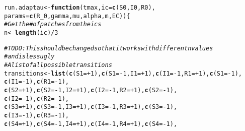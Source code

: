 \documentclass{article}\usepackage[]{graphicx}\usepackage[]{color}
\makeatletter
\newcommand{\hlnum}[1]{\textcolor[rgb]{0.686,0.059,0.569}{#1}}%
\newcommand{\hlcom}[1]{\textcolor[rgb]{0.678,0.584,0.686}{\textit{#1}}}%
\newcommand{\hlopt}[1]{\textcolor[rgb]{0,0,0}{#1}}%
\newcommand{\hlstd}[1]{\textcolor[rgb]{0.345,0.345,0.345}{#1}}%
\newcommand{\hlkwa}[1]{\textcolor[rgb]{0.161,0.373,0.58}{\textbf{#1}}}%
\newcommand{\hlkwb}[1]{\textcolor[rgb]{0.69,0.353,0.396}{#1}}%
\newcommand{\hlkwc}[1]{\textcolor[rgb]{0.333,0.667,0.333}{#1}}%
\newcommand{\hlkwd}[1]{\textcolor[rgb]{0.737,0.353,0.396}{\textbf{#1}}}%
\newenvironment{kframe}{%
 \def\at@end@of@kframe{}%
 \ifinner\ifhmode%
  \def\at@end@of@kframe{\end{minipage}}%
  \begin{minipage}{\columnwidth}%
 \fi\fi%
 \def\FrameCommand##1{\hskip\@totalleftmargin \hskip-\fboxsep
 \colorbox{shadecolor}{##1}\hskip-\fboxsep
     \hskip-\linewidth \hskip-\@totalleftmargin \hskip\columnwidth}%
 \MakeFramed {\advance\hsize-\width
   \@totalleftmargin\z@ \linewidth\hsize
   \@setminipage}}%
 {\par\unskip\endMakeFramed%
 \at@end@of@kframe}
\newenvironment{knitrout}{}{} %
\makeatother
\begin{document}
\begin{knitrout}
\color{fgcolor}\begin{kframe}
\begin{alltt}
  \hlstd{run.adaptau} \hlkwb{<-}\hlkwa{function}\hlstd{(}\hlkwc{tmax}\hlstd{,}\hlkwc{ic}\hlstd{=}\hlkwd{c}\hlstd{(S0,I0,R0),}
                              \hlkwc{params}\hlstd{=}\hlkwd{c}\hlstd{(R_0,gamma,mu,alpha,m,EC))\{}
  \hlcom{#Get the # of patches from the ics  }
  \hlstd{n} \hlkwb{<-} \hlkwd{length}\hlstd{(ic)}\hlopt{/}\hlnum{3}

  \hlcom{#TO DO: This should be changed so that it works with different n values }
  \hlcom{#and is less ugly}
  \hlcom{#A list of all possible transitions}
  \hlstd{transitions} \hlkwb{<-} \hlkwd{list}\hlstd{(}\hlkwd{c}\hlstd{(}\hlkwc{S1} \hlstd{=} \hlopt{+}\hlnum{1}\hlstd{),} \hlkwd{c}\hlstd{(}\hlkwc{S1} \hlstd{=} \hlopt{-}\hlnum{1}\hlstd{,} \hlkwc{I1}\hlstd{=} \hlopt{+}\hlnum{1}\hlstd{),} \hlkwd{c}\hlstd{(}\hlkwc{I1} \hlstd{=} \hlopt{-}\hlnum{1}\hlstd{,} \hlkwc{R1}\hlstd{=} \hlopt{+}\hlnum{1}\hlstd{),} \hlkwd{c}\hlstd{(}\hlkwc{S1} \hlstd{=} \hlopt{-}\hlnum{1}\hlstd{),}
                      \hlkwd{c}\hlstd{(}\hlkwc{I1} \hlstd{=} \hlopt{-}\hlnum{1}\hlstd{),} \hlkwd{c}\hlstd{(}\hlkwc{R1} \hlstd{=} \hlopt{-}\hlnum{1}\hlstd{),}
                    \hlkwd{c}\hlstd{(}\hlkwc{S2} \hlstd{=} \hlopt{+}\hlnum{1}\hlstd{),} \hlkwd{c}\hlstd{(}\hlkwc{S2} \hlstd{=} \hlopt{-}\hlnum{1}\hlstd{,} \hlkwc{I2}\hlstd{=} \hlopt{+}\hlnum{1}\hlstd{),} \hlkwd{c}\hlstd{(}\hlkwc{I2} \hlstd{=} \hlopt{-}\hlnum{1}\hlstd{,} \hlkwc{R2}\hlstd{=} \hlopt{+}\hlnum{1}\hlstd{),} \hlkwd{c}\hlstd{(}\hlkwc{S2} \hlstd{=} \hlopt{-}\hlnum{1}\hlstd{),}
                    \hlkwd{c}\hlstd{(}\hlkwc{I2} \hlstd{=} \hlopt{-}\hlnum{1}\hlstd{),} \hlkwd{c}\hlstd{(}\hlkwc{R2} \hlstd{=} \hlopt{-}\hlnum{1}\hlstd{),}
                    \hlkwd{c}\hlstd{(}\hlkwc{S3} \hlstd{=} \hlopt{+}\hlnum{1}\hlstd{),} \hlkwd{c}\hlstd{(}\hlkwc{S3} \hlstd{=} \hlopt{-}\hlnum{1}\hlstd{,} \hlkwc{I3}\hlstd{=} \hlopt{+}\hlnum{1}\hlstd{),} \hlkwd{c}\hlstd{(}\hlkwc{I3} \hlstd{=} \hlopt{-}\hlnum{1}\hlstd{,} \hlkwc{R3}\hlstd{=} \hlopt{+}\hlnum{1}\hlstd{),} \hlkwd{c}\hlstd{(}\hlkwc{S3} \hlstd{=} \hlopt{-}\hlnum{1}\hlstd{),}
                    \hlkwd{c}\hlstd{(}\hlkwc{I3} \hlstd{=} \hlopt{-}\hlnum{1}\hlstd{),} \hlkwd{c}\hlstd{(}\hlkwc{R3} \hlstd{=} \hlopt{-}\hlnum{1}\hlstd{),}
                    \hlkwd{c}\hlstd{(}\hlkwc{S4} \hlstd{=} \hlopt{+}\hlnum{1}\hlstd{),} \hlkwd{c}\hlstd{(}\hlkwc{S4} \hlstd{=} \hlopt{-}\hlnum{1}\hlstd{,} \hlkwc{I4}\hlstd{=} \hlopt{+}\hlnum{1}\hlstd{),} \hlkwd{c}\hlstd{(}\hlkwc{I4} \hlstd{=} \hlopt{-}\hlnum{1}\hlstd{,} \hlkwc{R4}\hlstd{=} \hlopt{+}\hlnum{1}\hlstd{),} \hlkwd{c}\hlstd{(}\hlkwc{S4} \hlstd{=} \hlopt{-}\hlnum{1}\hlstd{),}

\end{alltt}
\end{kframe}
\end{knitrout}
\end{document}

